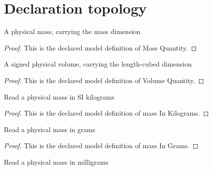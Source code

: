\section{Declaration topology}
\begin{definition}
  \label{def:physics:phyx-mini-0414:phyxminiproblems-problemphyxmini0414-massquantity}
  A physical mass, carrying the mass dimension
\end{definition}
\begin{proof}
  This is the declared model definition of Mass Quantity.
\end{proof}
\begin{definition}
  \label{def:physics:phyx-mini-0414:phyxminiproblems-problemphyxmini0414-volumequantity}
  A signed physical volume, carrying the length-cubed dimension
\end{definition}
\begin{proof}
  This is the declared model definition of Volume Quantity.
\end{proof}
\begin{definition}
  \label{def:physics:phyx-mini-0414:phyxminiproblems-problemphyxmini0414-massinkilograms}
  Read a physical mass in SI kilograms
\end{definition}
\begin{proof}
  This is the declared model definition of mass In Kilograms.
\end{proof}
\begin{definition}
  \label{def:physics:phyx-mini-0414:phyxminiproblems-problemphyxmini0414-massingrams}
  Read a physical mass in grams
\end{definition}
\begin{proof}
  This is the declared model definition of mass In Grams.
\end{proof}
\begin{definition}
  \label{def:physics:phyx-mini-0414:phyxminiproblems-problemphyxmini0414-massinmilligrams}
  Read a physical mass in milligrams
\end{definition}

